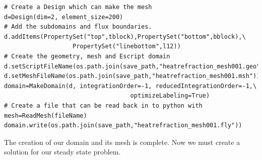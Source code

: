 \begin{verbatim}
# Create a Design which can make the mesh
d=Design(dim=2, element_size=200)
# Add the subdomains and flux boundaries.
d.addItems(PropertySet("top",tblock),PropertySet("bottom",bblock),\
                   PropertySet("linebottom",l12))
# Create the geometry, mesh and Escript domain
d.setScriptFileName(os.path.join(save_path,"heatrefraction_mesh001.geo"))
d.setMeshFileName(os.path.join(save_path,"heatrefraction_mesh001.msh"))
domain=MakeDomain(d, integrationOrder=-1, reducedIntegrationOrder=-1,\
                                   optimizeLabeling=True)
# Create a file that can be read back in to python with mesh=ReadMesh(fileName)
domain.write(os.path.join(save_path,"heatrefraction_mesh001.fly"))
\end{verbatim}
The creation of our domain and its mesh is complete. Now we must create a solution for our steady state problem.

